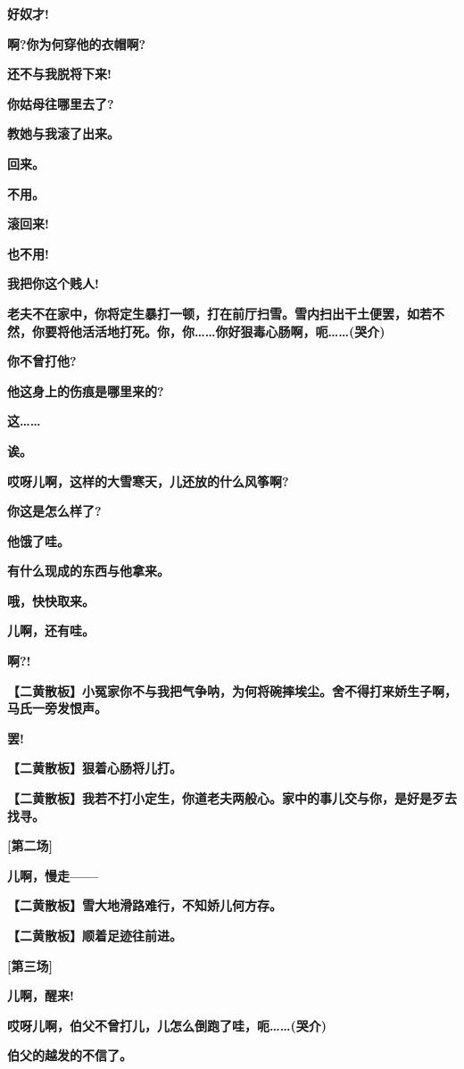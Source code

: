 \textbf{好奴才!}

\textbf{啊?你为何穿他的衣帽啊?}

\textbf{还不与我脱将下来!}

\textbf{你姑母往哪里去了?}

\textbf{教她与我滚了出来。}

\textbf{回来。}

\textbf{不用。}

\textbf{滚回来!}

\textbf{也不用!}

\textbf{我把你这个贱人!}

\textbf{老夫不在家中，你将定生暴打一顿，打在前厅扫雪。雪内扫出干土便罢，如若不然，你要将他活活地打死。你，你\ldots{}\ldots{}你好狠毒心肠啊，呃\ldots{}\ldots{}(哭介)}

\textbf{你不曾打他?}

\textbf{他这身上的伤痕是哪里来的?}

\textbf{这\ldots{}\ldots{}}

\textbf{诶。}

\textbf{哎呀儿啊，这样的大雪寒天，儿还放的什么风筝啊?}

\textbf{你这是怎么样了?}

\textbf{他饿了哇。}

\textbf{有什么现成的东西与他拿来。}

\textbf{哦，快快取来。}

\textbf{儿啊，还有哇。}

\textbf{啊?!}

\textbf{【二黄散板】小冤家你不与我把气争呐，为何将碗摔埃尘。舍不得打来娇生子啊，马氏一旁发恨声。}

\textbf{罢!}

\textbf{【二黄散板】狠着心肠将儿打。}

\textbf{【二黄散板】我若不打小定生，你道老夫两般心。家中的事儿交与你，是好是歹去找寻。}

\textbf{{[}第二场{]}}

\textbf{儿啊，慢走------}

\textbf{【二黄散板】雪大地滑路难行，不知娇儿何方存。}

\textbf{【二黄散板】顺着足迹往前进。}

\textbf{{[}第三场{]}}

\textbf{儿啊，醒来!}

\textbf{哎呀儿啊，伯父不曾打儿，儿怎么倒跑了哇，呃\ldots{}\ldots{}(哭介)}

\textbf{伯父的越发的不信了。}

